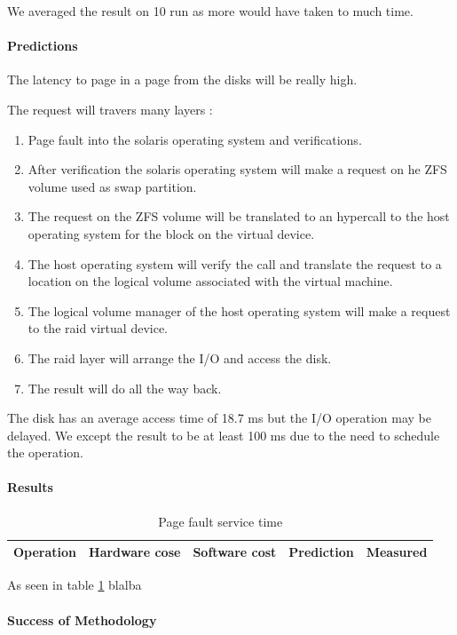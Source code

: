 We averaged the result on 10 run as more would have taken to much time.

\paragraph{Predictions}
The latency to page in a page from the disks will be really high.

The request will travers many layers :
\begin{enumerate}
\item Page fault into the solaris operating system and verifications.
\item After verification the solaris operating system will make a request on
he ZFS volume used as swap partition.
\item The request on the ZFS volume will be translated to an hypercall to the
host operating system for the block on the virtual device.
\item The host operating system will verify the call and translate the request
to a location on the logical volume associated with the virtual machine.
\item The logical volume manager of the host operating system will make a
request to the raid virtual device.
\item The raid layer will arrange the I/O and access the disk.
\item The result will do all the way back.
\end{enumerate}

The disk has an average access time of 18.7 ms but the I/O operation may be
delayed.
We except the result to be at least 100 ms due to the need to schedule the
operation.

\paragraph{Results}
\begin{table}[h]
\begin{center}
\begin{tabular}{| l | l | l | l | l |}
\hline
Operation & Hardware cose & Software cost & Prediction & Measured \\
\hline
\end{tabular}
\end{center}
\caption{Page fault service time\label{tab:page-fault}}
\end{table}

As seen in table \ref{tab:page-fault} blalba
\paragraph{Success of Methodology}

